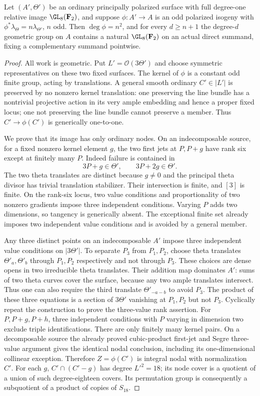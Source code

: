 \begin{lemma}
\label{lem:ordinary-ppav-isogeny-block}
Let $(A',\Theta')$ be an ordinary principally polarized surface with
full degree-one relative image $\GL_8(\mathbf F_2)$, and suppose
$\phi:A'\to A$ is an odd polarized isogeny with
$\phi^*\lambda_\Theta=n\lambda_{\Theta'}$, $n$ odd.
Then $\deg\phi=n^2$, and for every $d\ge n+1$ the degree-$d$
geometric group on $A$ contains a natural $\GL_8(\mathbf F_2)$ on an
actual direct summand, fixing a complementary summand pointwise.
\end{lemma}
\begin{proof}
All work is geometric. Put $L'=\mathcal O(3\Theta')$ and choose symmetric
representatives on these two fixed surfaces. The kernel of $\phi$ is a
constant odd finite group, acting by translations.
A general smooth ordinary $C'\in|L'|$ is preserved by no nonzero kernel
translation: one preserving the line bundle has a nontrivial projective
action in its very ample embedding and hence a proper fixed locus; one
not preserving the line bundle cannot preserve a member. Thus
$C'\to\phi(C')$ is generically one-to-one.

We prove that its image has only ordinary nodes. On an indecomposable
source, for a fixed nonzero kernel element $g$, the two first jets at
$P,P+g$ have rank six except at finitely many $P$. Indeed failure is
contained in
\[
               3P+g\in\Theta',\qquad 3P+2g\in\Theta'.
\]
The two theta translates are distinct because $g\ne0$ and the principal
theta divisor has trivial translation stabilizer. Their intersection is
finite, and $[3]$ is finite. On the rank-six locus, two value conditions
and proportionality of two nonzero gradients impose three independent
conditions. Varying $P$ adds two dimensions, so tangency is generically
absent. The exceptional finite set already imposes two independent value
conditions and is avoided by a general member.

Any three distinct points on an indecomposable $A'$ impose three
independent value conditions on $|3\Theta'|$. To separate $P_3$ from
$P_1,P_2$, choose theta translates $\Theta'_a,\Theta'_b$ through $P_1,P_2$
respectively and not through $P_3$. These choices are dense opens in two
irreducible theta translates. Their addition map dominates $A'$: sums of
two theta curves cover the surface, because any two ample translates
intersect. Thus one can also require the third translate
$\Theta'_{-a-b}$ to avoid $P_3$. The product of these three equations is
a section of $3\Theta'$ vanishing at $P_1,P_2$ but not $P_3$. Cyclically
repeat the construction to prove the three-value rank assertion.
For $P,P+g,P+h$, three independent conditions with $P$ varying in dimension
two exclude triple identifications. There are only finitely many kernel
pairs. On a decomposable source the already proved cubic-product
first-jet and Segre three-value argument gives the identical nodal
conclusion, including its one-dimensional collinear exception. Therefore
$Z=\phi(C')$ is integral nodal with normalization $C'$. For each $g$,
$C'\cap(C'-g)$ has degree $L'^2=18$; its node cover is a quotient of a
union of such degree-eighteen covers. Its permutation group is consequently
a subquotient of a product of copies of $S_{18}$.


\end{proof}
